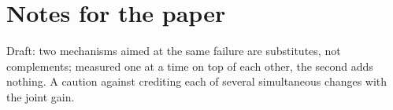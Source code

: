 \documentclass{../polyexp}
\begin{document}
\section{Notes for the paper}
Draft: two mechanisms aimed at the same failure are substitutes, not complements; measured one at a time on top of each other, the second adds nothing. A caution against crediting each of several simultaneous changes with the joint gain.

\end{document}
